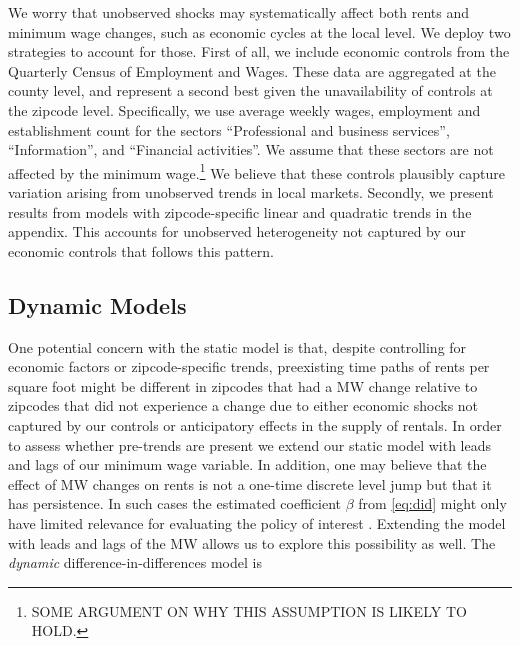 
We worry that unobserved shocks may systematically affect both rents and minimum wage 
changes, such as economic cycles at the local level. We deploy two strategies to account 
for those. First of all, we include economic controls from the Quarterly Census of 
Employment and Wages. These data are aggregated at the county level, and represent a 
second best given the unavailability of controls at the zipcode level. Specifically, we 
use average weekly wages, employment and establishment count for the sectors 
``Professional and business services'', ``Information'', and ``Financial activities''. 
We assume that these sectors are not affected by the minimum wage.\footnote{SOME ARGUMENT
	ON WHY THIS ASSUMPTION IS LIKELY TO HOLD.}
We believe that these controls plausibly capture variation arising from unobserved trends 
in local markets. Secondly, we present results from models with zipcode-specific linear 
and quadratic trends in the appendix. This accounts for unobserved heterogeneity not 
captured by our economic controls that follows this pattern.

\subsection{Dynamic Models}

One potential concern with the static model is that, despite controlling for economic 
factors or zipcode-specific trends, preexisting time paths of rents per square foot might 
be different in zipcodes that had a MW change relative to zipcodes that did not experience 
a change due to either economic shocks not captured by our controls or anticipatory effects 
in the supply of rentals. In order to assess whether pre-trends are present we extend our 
static model with leads and lags of our minimum wage variable. In addition, one may 
believe that the effect of MW changes on rents is not a one-time discrete level jump but 
that it has persistence. In such cases the estimated coefficient $\beta$ from 
\autoref{eq:did} might only have limited relevance for evaluating the policy of interest 
\parencite{callaway2019}. Extending the model with leads and lags of the MW allows us to 
explore this possibility as well. The \textit{dynamic} difference-in-differences model is

